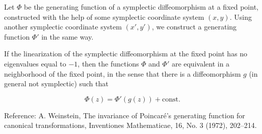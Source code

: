 Let $\Phi$ be the generating function of a symplectic diffeomorphism at a fixed point, constructed with the help of some symplectic coordinate system $(x, y)$. Using another symplectic coordinate system $(x', y')$, we construct a generating function $\Phi'$ in the same way.

If the linearization of the symplectic diffeomorphism at the fixed point has no eigenvalues equal to $-1$, then the functions $\Phi$ and $\Phi'$ are equivalent in a neighborhood of the fixed point, in the sense that there is a diffeomorphism $g$ (in general not symplectic) such that

$$\Phi(z) = \Phi'(g(z)) + \text{const}.$$

Reference: A. Weinstein, The invariance of Poincaré's generating function for canonical transformations, Inventiones Mathematicae, 16, No. 3 (1972), 202–214.
